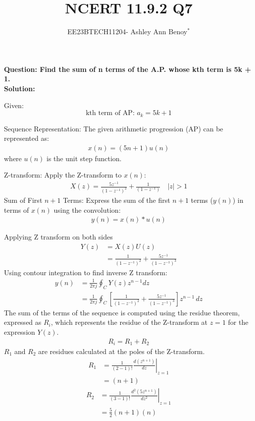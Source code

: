 \documentclass[journal,12pt,twocolumn]{IEEEtran}
\theoremstyle{remark}
\begin{document}

\vspace{3cm}

\title{NCERT 11.9.2  Q7}
\author{EE23BTECH11204- Ashley Ann Benoy$^{*}$%
}
\maketitle
\newpage
\bigskip

\renewcommand{\thefigure}{\theenumi}
\renewcommand{\thetable}{\theenumi}


\textbf{Question:
Find the sum of n terms of the A.P. whose kth term is 5k + 1. }\\


\textbf{Solution:}



Given:
\[
\text{kth term of AP: } a_k = 5k + 1
\]

Sequence Representation:
The given arithmetic progression (AP) can be represented as:
\begin{align}
x(n) = (5n + 1)u(n)
\end{align}
where \( u(n) \) is the unit step function.

Z-transform:
Apply the Z-transform to \( x(n) \):
\begin{align}
X(z) = \frac{5z^{-1}}{(1 - z^{-1})^2} + \frac{1}{(1 - z^{-1})}
\quad |z|>1
\end{align}
Sum of First \( n+1 \) Terms:
Express the sum of the first \( n+1 \) terms (\( y(n) \)) in terms of \( x(n) \) using the convolution:
\begin{align}
y(n) = x(n) * u(n)
\end{align}

Applying Z transform on both sides
\begin{align}
	Y(z) &= X(z)U(z)\\
	&=\frac{1}{(1-z^{-1})^2} + \frac{5z^{-1}}{(1-z^{-1})^3}
\end{align}
Using contour integration to find inverse Z transform:
\begin{align}
	y(n) &= \frac{1}{2\pi j} \oint_C Y(z) z^{n-1} dz\\
	&= \frac{1}{2\pi j} \oint_C \left[ \frac{1}{(1-z^{-1})^2} + \frac{5z^{-1}}{(1-z^{-1})^3} \right]z^{n-1} \, dz
\end{align}
The sum of the terms of the sequence is computed using the residue theorem, expressed as $R_i$, which represents the residue of the Z-transform at $ z=1 $ for the expression $ Y(z) $.
\begin{align}
	R_i=R_1 + R_2
\end{align}
 $R_1$ and $R_2$ are residues calculated at the poles of the Z-transform.
\begin{align}
		R_1 &= \frac{1}{{(2-1)!}} \left. \frac{d (z^{n+1})}{dz} \right|_{z=1} \\
	&=(n+1)
\end{align}
\begin{align}
	R_2 &= \frac{1}{{(3-1)!}} \left. \frac{d^2(5z^{n+1})}{dz^2} \right|_{z=1} \\
	&= \frac{5}{2}(n+1)(n)
\end{align}
\end{document}
